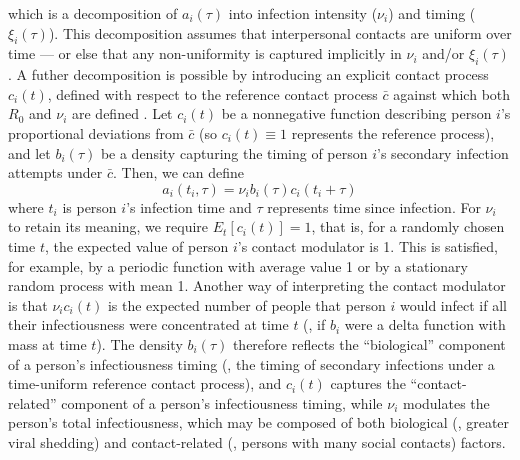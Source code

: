 %
which is a decomposition of $a_i(\tau)$ into infection intensity ($\nu_i$) and timing ($\xi_i(\tau)$). This decomposition assumes that interpersonal contacts are uniform over time --- or else that any non-uniformity is captured implicitly in $\nu_i$ and/or $\xi_i(\tau)$. A futher decomposition is possible by introducing an explicit contact process $c_i(t)$, defined with respect to the reference contact process $\bar{c}$ against which both $R_0$ and $\nu_i$ are defined \citep{dietz_estimation_1993}. Let $c_i(t)$ be a nonnegative function describing person $i$'s proportional deviations from $\bar{c}$ (so $c_i(t) \equiv 1$ represents the reference process), and let $b_i(\tau)$ be a density capturing the timing of person $i$'s secondary infection attempts under $\bar{c}$. Then, we can define
%
\begin{equation}
    a_i(t_i, \tau) = \nu_i b_i(\tau) c_i(t_i + \tau) 
    \label{eq:abc}
\end{equation}
%
where $t_i$ is person $i$'s infection time and $\tau$ represents time since infection. For $\nu_i$ to retain its meaning, we require $E_t[c_i(t)] = 1$, that is, for a randomly chosen time $t$, the expected value of person $i$'s contact modulator is 1. This is satisfied, for example, by a periodic function with average value 1 or by a stationary random process with mean 1. Another way of interpreting the contact modulator is that $\nu_i c_i(t)$ is the expected number of people that person $i$ would infect if all their infectiousness were concentrated at time $t$ (\ie, if $b_i$ were a delta function with mass at time $t$). The density $b_i(\tau)$ therefore reflects the ``biological'' component of a person's infectiousness timing (\ie, the timing of secondary infections under a time-uniform reference contact process), and $c_i(t)$ captures the ``contact-related'' component of a person's infectiousness timing, while $\nu_i$ modulates the person's total infectiousness, which may be composed of both biological (\eg, greater viral shedding) and contact-related (\eg, persons with many social contacts) factors. 

